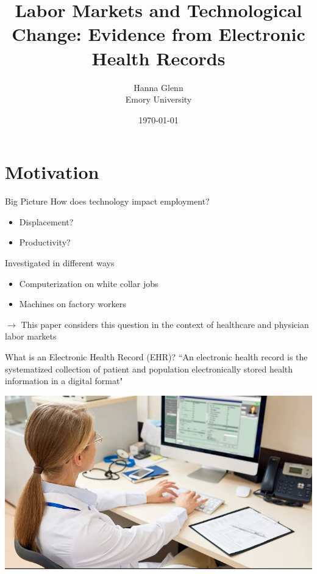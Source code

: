 \documentclass[10pt]{beamer}
\title{Labor Markets and Technological Change: Evidence from Electronic Health Records}
\subtitle{Hanna Glenn\\ \small Emory University}
\date{\today}
\begin{document}
\maketitle





\section[Motivation]{Motivation}

\begin{frame}{Big Picture}
How does technology impact employment?

    \begin{itemize}
        \item Displacement?
        \vspace{2mm}
        \item Productivity?
    \end{itemize}
    \vspace{3mm}
    
Investigated in different ways

    \begin{itemize}
        \item Computerization on white collar jobs
        \vspace{2mm}
        \item Machines on factory workers
    \end{itemize}
    
    \vspace{3mm}
    
    \pause
    
    \begin{alertblock}{$\rightarrow$ This paper considers this question in the context of healthcare and physician labor markets}\end{alertblock}
\end{frame}



\begin{frame}[fragile]{What is an Electronic Health Record (EHR)?}
``An electronic health record is the systematized collection of patient and population electronically stored health information in a digital format"

\vspace{5mm}
\centering
\includegraphics[scale=.35]{Objects/EHR_picture.PNG}
\end{frame}
\end{document}

